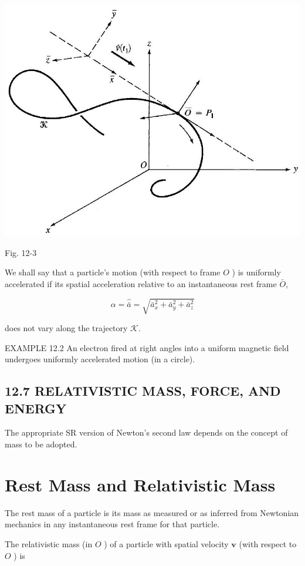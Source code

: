 \documentclass[10pt]{article}
\begin{document}
\begin{center}
\includegraphics[max width=\textwidth]{2024_04_03_41f90be4f896e21f0dc9g-180}
\end{center}

Fig. 12-3

We shall say that a particle's motion (with respect to frame $O$ ) is uniformly accelerated if its spatial acceleration relative to an instantaneous rest frame $\bar{O}$,

$$
\alpha=\hat{\bar{a}}=\sqrt{\bar{a}_{x}^{2}+\bar{a}_{y}^{2}+\bar{a}_{z}^{2}}
$$

does not vary along the trajectory $\mathscr{K}$.

EXAMPLE 12.2 An electron fired at right angles into a uniform magnetic field undergoes uniformly accelerated motion (in a circle).

\subsection*{12.7 RELATIVISTIC MASS, FORCE, AND ENERGY}
The appropriate SR version of Newton's second law depends on the concept of mass to be adopted.

\section*{Rest Mass and Relativistic Mass}
The rest mass of a particle is its mass as measured or as inferred from Newtonian mechanics in any instantaneous rest frame for that particle.

The relativistic mass (in $O$ ) of a particle with spatial velocity $\mathbf{v}$ (with respect to $O$ ) is
\end{document}
